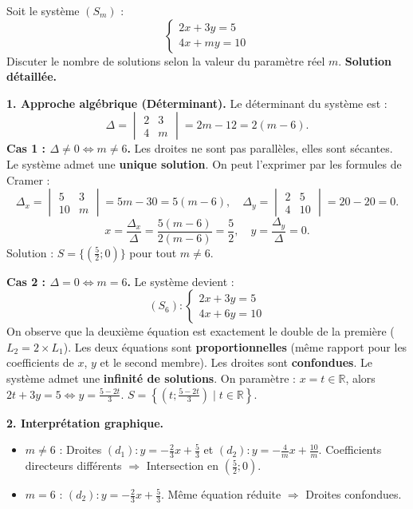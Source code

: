 \documentclass[11pt]{article}
\begin{document}
\begin{exoresolu}
Soit le système $(S_m)$ :
\[
\begin{cases} 2x + 3y = 5 \\ 4x + m y = 10 \end{cases}
\]
Discuter le nombre de solutions selon la valeur du paramètre réel $m$.
\tcblower
\textbf{Solution détaillée.}

\noindent\textbf{1. Approche algébrique (Déterminant).}
Le déterminant du système est :
\[
\Delta = \begin{vmatrix} 2 & 3 \\ 4 & m \end{vmatrix} = 2m - 12 = 2(m-6).
\]
\noindent\textbf{Cas 1 : $\Delta \neq 0 \Leftrightarrow m \neq 6$.}
Les droites ne sont pas parallèles, elles sont sécantes. Le système admet une \textbf{unique solution}.
On peut l'exprimer par les formules de Cramer :
\[
\Delta_x = \begin{vmatrix} 5 & 3 \\ 10 & m \end{vmatrix} = 5m - 30 = 5(m-6), \quad
\Delta_y = \begin{vmatrix} 2 & 5 \\ 4 & 10 \end{vmatrix} = 20 - 20 = 0.
\]
\[
x = \frac{\Delta_x}{\Delta} = \frac{5(m-6)}{2(m-6)} = \frac{5}{2}, \quad
y = \frac{\Delta_y}{\Delta} = 0.
\]
Solution : $S = \{(\frac{5}{2}; 0)\}$ pour tout $m \neq 6$.

\noindent\textbf{Cas 2 : $\Delta = 0 \Leftrightarrow m = 6$.}
Le système devient :
\[
(S_6) : \begin{cases} 2x + 3y = 5 \\ 4x + 6y = 10 \end{cases}
\]
On observe que la deuxième équation est exactement le double de la première ($L_2 = 2\times L_1$). Les deux équations sont \textbf{proportionnelles} (même rapport pour les coefficients de $x$, $y$ et le second membre).
Les droites sont \textbf{confondues}. Le système admet une \textbf{infinité de solutions}.
On paramètre : $x = t \in \mathbb{R}$, alors $2t + 3y = 5 \iff y = \frac{5-2t}{3}$.
$S = \left\{ \left(t; \frac{5-2t}{3}\right) \mid t \in \mathbb{R} \right\}$.

\noindent\textbf{2. Interprétation graphique.}
\begin{itemize}
\item $m \neq 6$ : Droites $(d_1): y = -\frac{2}{3}x + \frac{5}{3}$ et $(d_2): y = -\frac{4}{m}x + \frac{10}{m}$. Coefficients directeurs différents $\Rightarrow$ Intersection en $(\frac{5}{2}; 0)$.
\item $m = 6$ : $(d_2): y = -\frac{2}{3}x + \frac{5}{3}$. Même équation réduite $\Rightarrow$ Droites confondues.
\end{itemize}


\end{exoresolu}
\end{document}
